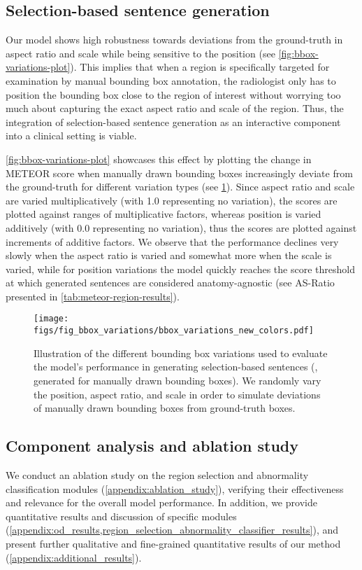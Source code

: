 \documentclass[10pt,twocolumn,letterpaper]{article}
\begin{document}
\subsection{Selection-based sentence generation}
Our model shows high robustness towards deviations from the ground-truth in aspect ratio and scale while being sensitive to the position (see 
\cref{fig:bbox-variations-plot}). This implies that when a region is specifically targeted for examination by manual bounding box annotation, the radiologist only has to position the bounding box close to the region of interest without worrying too much about capturing the exact aspect ratio and scale of the region. Thus, the integration of selection-based sentence generation as an interactive component into a clinical setting is viable.

\cref{fig:bbox-variations-plot} showcases this effect by plotting the change in METEOR score when manually drawn bounding boxes increasingly deviate from the ground-truth for different variation types (see \cref{fig:bbox-variations}). Since aspect ratio and scale are varied multiplicatively (with 1.0 representing no variation), the scores are plotted against ranges of multiplicative factors, whereas position is varied additively (with 0.0 representing no variation), thus the scores are plotted against increments of additive factors. We observe that the performance declines very slowly when the aspect ratio is varied and somewhat more when the scale is varied, while for position variations the model quickly reaches the score threshold at which generated sentences are considered anatomy-agnostic (see AS-Ratio presented in \cref{tab:meteor-region-results}).

\begin{figure}[t!]
  \centering
   \texttt{[image: figs/fig\_bbox\_variations/bbox\_variations\_new\_colors.pdf]}
   \caption{Illustration of the different bounding box variations used to evaluate the model's performance in generating selection-based sentences (\ie, generated for manually drawn bounding boxes). 
   We randomly vary the position, aspect ratio, and scale in order to simulate deviations of manually drawn bounding boxes from ground-truth boxes.}
   \label{fig:bbox-variations}
\end{figure}

\subsection{Component analysis and ablation study}
We conduct an ablation study on the region selection and abnormality classification modules (\cref{appendix:ablation_study}), verifying their effectiveness and relevance for the overall model performance. In addition, we provide quantitative results and discussion of specific modules (\cref{appendix:od_results,region_selection_abnormality_classifier_results}), and present further qualitative and fine-grained quantitative results of our method (\cref{appendix:additional_results}).
\end{document}
